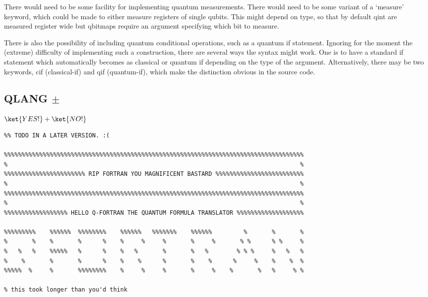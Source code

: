 There would need to be some facility for implementing quantum measurements. There would need to be some variant of a `measure' keyword, which could be made to either measure registers of single qubits. This might depend on type, so that by default qint are measured register wide but qbitmaps require an argument specifying which bit to measure.

There is also the possibility of including quantum conditional operations, such as a quantum if statement. Ignoring for the moment the (extreme) difficulty of implementing such a construction, there are several ways the syntax might work. One is to have a standard if statement which automatically becomes as classical or quantum if depending on the type of the argument. Alternatively, there may be two keywords, cif (classical-if) and qif (quantum-if), which make the distinction obvious in the source code.  

\subsection{QLANG $\pm$}
$\ket{YES!}+\ket{NO!}$


\begin{verbatim}
%% TODO IN A LATER VERSION. :(

%%%%%%%%%%%%%%%%%%%%%%%%%%%%%%%%%%%%%%%%%%%%%%%%%%%%%%%%%%%%%%%%%%%%%%%%%%%%%%%%%%%%%
%                                                                                   %
%%%%%%%%%%%%%%%%%%%%%%% RIP FORTRAN YOU MAGNIFICENT BASTARD %%%%%%%%%%%%%%%%%%%%%%%%%
%                                                                                   %
%%%%%%%%%%%%%%%%%%%%%%%%%%%%%%%%%%%%%%%%%%%%%%%%%%%%%%%%%%%%%%%%%%%%%%%%%%%%%%%%%%%%%
%                                                                                   %
%%%%%%%%%%%%%%%%%% HELLO Q-FORTRAN THE QUANTUM FORMULA TRANSLATOR %%%%%%%%%%%%%%%%%%%

%%%%%%%%%    %%%%%%  %%%%%%%%    %%%%%%   %%%%%%%    %%%%%%         %       %       %
%       %    %       %      %    %     %     %       %     %       % %      % %     %
%   %   %    %%%%%   %      %    %   %       %       %   %        % % %     %   %   %
%    %       %       %      %    %    %      %       %    %      %     %    %    %  %
%%%%%  %     %       %%%%%%%%    %     %     %       %     %    %       %   %     % %

% this took longer than you'd think
\end{verbatim}


